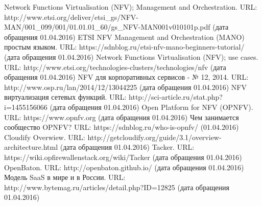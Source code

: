 \documentclass[oneside,final,14pt,a4paper]{extreport}
\begin{document}
\begin{thebibliography}{00}
 Network Functions Virtualisation (NFV); Management and Orchestration. URL: http://www.etsi.org/deliver/etsi\_gs/NFV-MAN/001\_099/001/01.01.01\_60/gs\_NFV-MAN001v010101p.pdf (дата обращения 01.04.2016)
 ETSI NFV Management and Orchestration (MANO) простым языком. URL: https://sdnblog.ru/etsi-nfv-mano-beginners-tutorial/ (дата обращения 01.04.2016)
 Network Functions Virtualisation (NFV); use cases. URL: http://www.etsi.org/technologies-clusters/technologies/nfv (дата обращения 01.04.2016)
 NFV для корпоративных сервисов - № 12, 2014. URL: http://www.osp.ru/lan/2014/12/13044225 (дата обращения 01.04.2016)
 NFV виртуализация сетевых функций. URL: http://sci-article.ru/stat.php?i=1455156066 (дата обращения 01.04.2016)
 Open Platform for NFV (OPNFV). URL: https://www.opnfv.org (дата обращения 01.04.2016)
 Чем занимается сообщество OPNFV? URL:  https://sdnblog.ru/who-is-opnfv/ (01.04.2016)
 Cloudify Overwiew. URL: http://getcloudify.org/guide/3.1/overview-architecture.html (дата обращения 01.04.2016)
 Tacker. URL: https://wiki.opfirewallenstack.org/wiki/Tacker (дата обращения 01.04.2016)
 OpenBaton. URL: http://openbaton.github.io/ (дата обращения 01.04.2016)
 Модель SaaS в мире и в России. URL: http://www.bytemag.ru/articles/detail.php?ID=12825 (дата обращения 01.04.2016)
\end{thebibliography}

\end{document}
